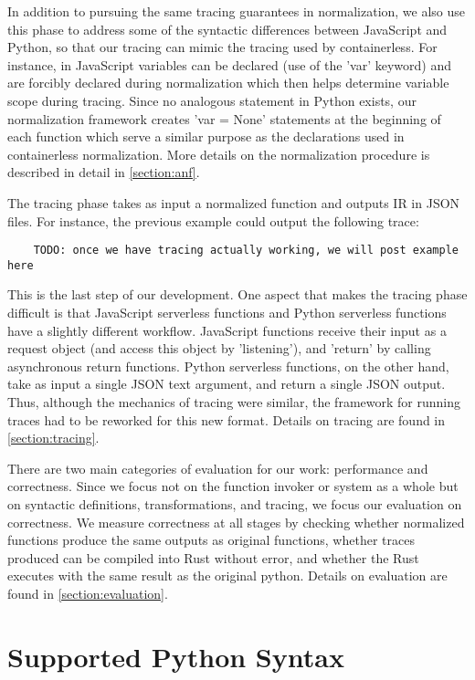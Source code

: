 \documentclass[acmsmall,review,authorversion]{acmart}
\begin{document}
In addition to pursuing the same tracing guarantees in normalization, we also use this phase to address some of the syntactic differences between JavaScript and Python, so that our tracing can mimic the tracing used by containerless. For instance, in JavaScript variables can be declared (use of the 'var' keyword) and are forcibly declared during normalization which then helps determine variable scope during tracing. Since no analogous statement in Python exists, our normalization framework creates 'var = None' statements at the beginning of each function which serve a similar purpose as the declarations used in containerless normalization. More details on the normalization procedure is described in detail in \ref{section:anf}. 
\par 
The tracing phase takes as input a normalized function and outputs IR in JSON files. For instance, the previous example could output the following trace:
\begin{verbatim}
    TODO: once we have tracing actually working, we will post example here
\end{verbatim}
This is the last step of our development. One aspect that makes the tracing phase difficult is that JavaScript serverless functions and Python serverless functions have a slightly different workflow. JavaScript functions receive their input as a request object (and access this object by 'listening'), and 'return' by calling asynchronous return functions. Python serverless functions, on the other hand, take as input a single JSON text argument, and return a single JSON output. Thus, although the mechanics of tracing were similar, the framework for running traces had to be reworked for this new format. Details on tracing are found in \ref{section:tracing}.
\par
There are two main categories of evaluation for our work: performance and correctness. Since we focus not on the function invoker or system as a whole but on syntactic definitions, transformations, and tracing, we focus our evaluation on correctness. We measure correctness at all stages by checking whether normalized functions produce the same outputs as original functions, whether traces produced can be compiled into Rust without error, and whether the Rust executes with the same result as the original python. Details on evaluation are found in \ref{section:evaluation}.

\section{Supported Python Syntax}
\label{section:pysyntax}
\end{document}
